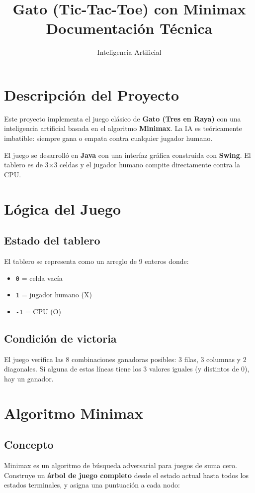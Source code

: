 \documentclass[12pt,a4paper]{article}
\title{\textbf{Gato (Tic-Tac-Toe) con Minimax}\\
  \large Documentación Técnica}
\author{Inteligencia Artificial}
\date{}
\begin{document}
\maketitle
\tableofcontents
\newpage

\section{Descripción del Proyecto}
Este proyecto implementa el juego clásico de \textbf{Gato (Tres en Raya)} con una inteligencia artificial basada en el algoritmo \textbf{Minimax}. La IA es teóricamente imbatible: siempre gana o empata contra cualquier jugador humano.

El juego se desarrolló en \textbf{Java} con una interfaz gráfica construida con \textbf{Swing}. El tablero es de 3×3 celdas y el jugador humano compite directamente contra la CPU.

\section{Lógica del Juego}

\subsection{Estado del tablero}
El tablero se representa como un arreglo de 9 enteros donde:
\begin{itemize}
  \item \texttt{0} = celda vacía
  \item \texttt{1} = jugador humano (X)
  \item \texttt{-1} = CPU (O)
\end{itemize}

\subsection{Condición de victoria}
El juego verifica las 8 combinaciones ganadoras posibles: 3 filas, 3 columnas y 2 diagonales. Si alguna de estas líneas tiene los 3 valores iguales (y distintos de 0), hay un ganador.

\section{Algoritmo Minimax}

\subsection{Concepto}
Minimax es un algoritmo de búsqueda adversarial para juegos de suma cero. Construye un \textbf{árbol de juego completo} desde el estado actual hasta todos los estados terminales, y asigna una puntuación a cada nodo:
\end{document}
